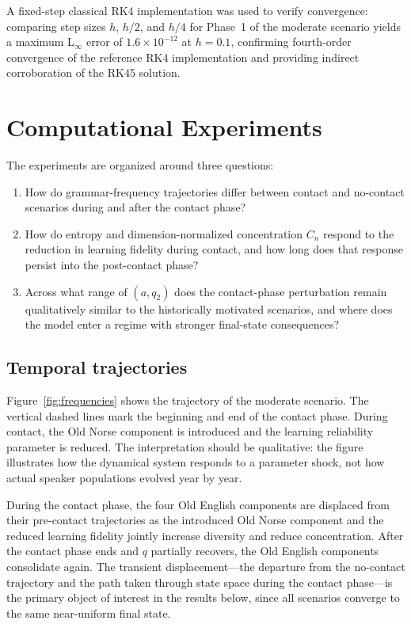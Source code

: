 \documentclass[11pt]{article}
\begin{document}
A fixed-step classical RK4 implementation was used to verify convergence: comparing step sizes $h$, $h/2$, and $h/4$ for Phase~1 of the moderate scenario yields a maximum L$_\infty$ error of $1.6 \times 10^{-12}$ at $h=0.1$, confirming fourth-order convergence of the reference RK4 implementation and providing indirect corroboration of the RK45 solution.

\section{Computational Experiments}

The experiments are organized around three questions:
\begin{enumerate}[noitemsep]
    \item How do grammar-frequency trajectories differ between contact and no-contact
          scenarios during and after the contact phase?
    \item How do entropy and dimension-normalized concentration $C_n$ respond to the reduction in learning fidelity
          during contact, and how long does that response persist into the
          post-contact phase?
    \item Across what range of $(a, q_2)$ does the contact-phase perturbation remain
          qualitatively similar to the historically motivated scenarios, and where
          does the model enter a regime with stronger final-state consequences?
\end{enumerate}

\subsection{Temporal trajectories}

Figure~\ref{fig:frequencies} shows the trajectory of the moderate scenario. The vertical dashed lines mark the beginning and end of the contact phase. During contact, the Old Norse component is introduced and the learning reliability parameter is reduced. The interpretation should be qualitative: the figure illustrates how the dynamical system responds to a parameter shock, not how actual speaker populations evolved year by year.

During the contact phase, the four Old English components are displaced from their pre-contact trajectories as the introduced Old Norse component and the reduced learning fidelity jointly increase diversity and reduce concentration. After the contact phase ends and $q$ partially recovers, the Old English components consolidate again. The transient displacement---the departure from the no-contact trajectory and the path taken through state space during the contact phase---is the primary object of interest in the results below, since all scenarios converge to the same near-uniform final state.
\end{document}
